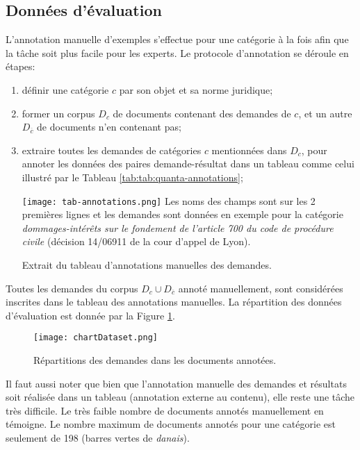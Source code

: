 \subsection{Données d'évaluation}
L'annotation manuelle d'exemples s'effectue pour une catégorie à la fois afin que la tâche soit plus facile pour les experts. Le protocole d'annotation se déroule en étapes: 
\begin{enumerate}
	\item définir une catégorie $c$ par son objet et sa norme juridique;
	\item former un corpus $D_c$ de documents contenant des demandes de $c$, et un autre $D_{\overline{c}}$ de documents n'en contenant pas; 
	\item extraire toutes les demandes de catégories $c$ mentionnées dans $D_c$, pour annoter les données des paires demande-résultat dans un tableau comme celui illustré par le  Tableau \ref{tab:tab:quanta-annotations};
	
	\begin{table}[!htb]
		\texttt{[image: tab-annotations.png]}
		\scriptsize{Les noms des champs sont sur les 2 premières lignes et les demandes sont données en exemple pour la catégorie \textit{dommages-intérêts sur le fondement de l'article 700 du code de procédure civile} (décision 14/06911 de la cour d'appel de Lyon).}
		\caption{Extrait du tableau d'annotations manuelles des demandes.} \label{tab:tab:quanta-annotations}
	\end{table}
\end{enumerate}


 Toutes les demandes du corpus $D_{c} \cup D_{\overline{c}}$  annoté manuellement, sont considérées inscrites dans le tableau des annotations manuelles. La répartition des données d'évaluation est donnée par la Figure \ref{fig:quanta:hist-repartition-docs}.  
 
 \begin{figure}[!htb]
 	\texttt{[image: chartDataset.png]}
 	\caption{Répartitions des demandes dans les documents annotées.}\label{fig:quanta:hist-repartition-docs}
 \end{figure}
 
 Il faut aussi noter que bien que l'annotation manuelle des demandes et résultats soit réalisée dans un tableau (annotation externe au contenu), elle reste une tâche très difficile. Le très faible nombre de documents annotés manuellement en témoigne. Le nombre  maximum de documents annotés pour une catégorie est seulement de 198 (barres vertes de \textit{danais}).%


